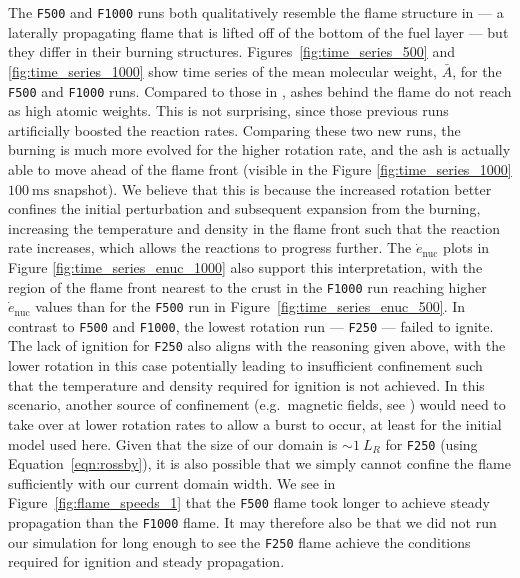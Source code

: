 \documentclass[preprint,times,tighten]{aastex63}
\begin{document}
The {\tt F500} and {\tt F1000} runs both qualitatively resemble the flame structure in 
\citet{flame_wave1} --- a laterally propagating flame that is lifted off of the bottom of the fuel 
layer --- but they differ in their burning structures. Figures~\ref{fig:time_series_500} and 
\ref{fig:time_series_1000} show time series of the mean molecular weight, $\bar{A}$, for the {\tt 
F500} and {\tt F1000} runs.  Compared to those in \cite{flame_wave1}, ashes behind the flame do not 
reach as high atomic weights. This is not surprising, since those previous runs artificially 
boosted the reaction rates.  Comparing these two new runs, the burning is much more evolved for the 
higher rotation rate, and the ash is actually able to move ahead of the flame front (visible in the 
Figure  \ref{fig:time_series_1000} $100~\mathrm{ms}$ snapshot). We believe that this is because the increased 
rotation better confines the initial perturbation and subsequent expansion from the burning, 
increasing the temperature and density in the flame front such that the reaction rate increases, 
which allows the reactions to progress further. The $\dot{e}_\mathrm{nuc}$ plots in Figure 
\ref{fig:time_series_enuc_1000} also support this interpretation, with the region of the 
flame front nearest to the crust in the {\tt F1000} run reaching higher $\dot{e}_\mathrm{nuc}$ values 
than for the {\tt F500} run in Figure~\ref{fig:time_series_enuc_500}. In contrast to {\tt F500} 
and {\tt F1000}, the lowest rotation run --- {\tt F250} --- failed to ignite. The lack of ignition 
for {\tt F250} also aligns with the reasoning given above, with the lower rotation in this case 
potentially leading to insufficient confinement such that the temperature and density required for 
ignition is not achieved. In this scenario, another source of confinement (e.g.\ magnetic fields, see \citep{art-2016-cavecchi-etal}) 
would need to take over at lower rotation rates to allow a burst to occur, at least for the initial 
model used here. Given that the size of our domain is $\sim 1~L_R$ for {\tt F250} (using Equation~\ref{eqn:rossby}), it is also possible that we simply cannot confine the flame sufficiently with our current domain width. We see in Figure~\ref{fig:flame_speeds_1} that the {\tt F500} flame took longer to achieve steady propagation than the {\tt F1000} flame. It may therefore also be that we did not run our simulation for long enough to see the {\tt F250} flame achieve the conditions required for ignition and steady propagation.
\end{document}
